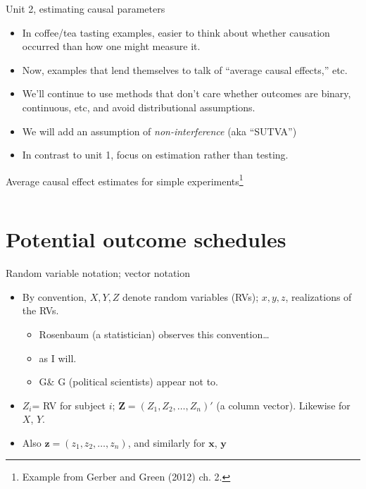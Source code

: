 \begin{frame}{Unit 2, estimating causal parameters}
  \begin{itemize}
  \item In coffee/tea tasting examples, easier to think about whether causation occurred than how one might measure it.
  \item Now, examples that lend themselves to talk of ``average causal effects,'' etc.
  \item We'll continue to use methods that don't care whether outcomes
    are binary, continuous, etc, and avoid distributional assumptions.
  \item We will add an assumption of \textit{non-interference} (aka ``SUTVA'')
  \item In contrast to unit 1, focus on estimation rather than testing.
  \end{itemize}
\end{frame}

\begin{frame}{Average causal effect estimates for simple
    experiments\footnote{Example from Gerber and Green (2012) ch. 2.}}


  \begin{columns}
    \begin{Column}
    \end{Column}
    \begin{Column}
      
    \end{Column}
  \end{columns}

  
\end{frame}

\section{Potential outcome schedules}

\begin{frame}{Random variable notation; vector notation}
  
  \begin{itemize}
  \item By convention, $X, Y, Z$ denote random variables (RVs); $x, y, z$, realizations of the RVs.
    \begin{itemize}
    \item Rosenbaum (a statistician) observes this convention\ldots
    \item as I will.
    \item G\& G (political scientists) appear not to.
    \end{itemize}
  \item $Z_i$= RV for subject $i$; $\mathbf{Z}=(Z_1, Z_2, \ldots, Z_n)'$ (a column vector).  Likewise for $X$, $Y$.
  \item Also $\mathbf{z}=(z_1, z_2, \ldots, z_n)$, and similarly for $\mathbf{x}$, $\mathbf{y}$
  \end{itemize}


\end{frame}

